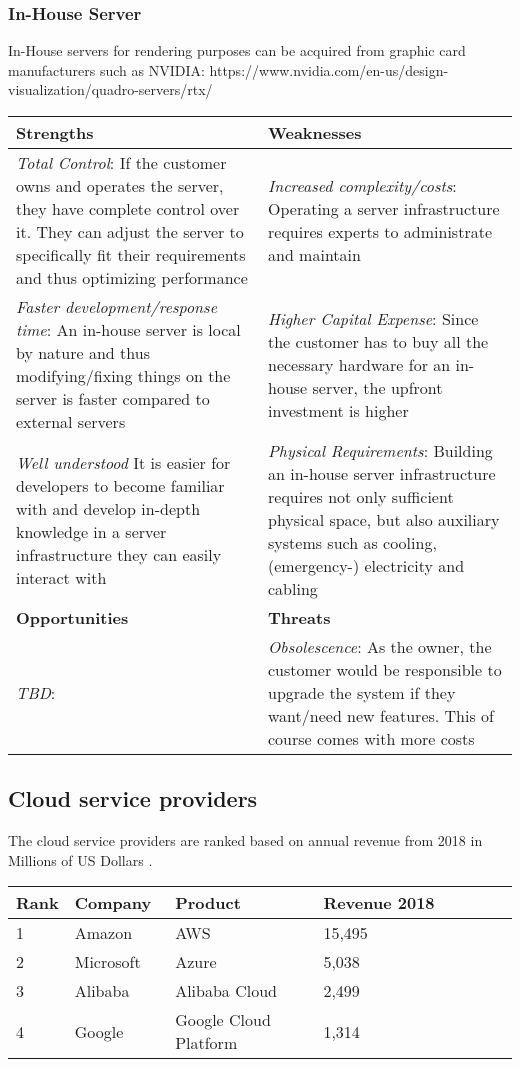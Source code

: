 \subsubsection{In-House Server}
In-House servers for rendering purposes can be acquired from graphic card manufacturers such as NVIDIA: https://www.nvidia.com/en-us/design-visualization/quadro-servers/rtx/

\begin{center}
\begin{tabular}{ | p{0.5\linewidth} | p{0.5\linewidth} | } 
 \hline
 \textbf{Strengths} & \textbf{Weaknesses}\\ 
\hline
 \textit{Total Control}: If the customer owns and operates the server, they have complete control over it. They can adjust the server to specifically fit their requirements and thus optimizing performance & \textit{Increased complexity/costs}: Operating a server infrastructure requires experts to administrate and maintain \\ 
\textit{Faster development/response time}: An in-house server is local by nature and thus modifying/fixing things on the server is faster compared to external servers & \textit{Higher Capital Expense}: Since the customer has to buy all the necessary hardware for an in-house server, the upfront investment is higher \\
\textit{Well understood} It is easier for developers to become familiar with and develop in-depth knowledge in a server infrastructure they can easily interact with & \textit{Physical Requirements}: Building an in-house server infrastructure requires not only sufficient physical space, but also auxiliary systems such as cooling, (emergency-) electricity and cabling \\
 \hline
 \textbf{Opportunities} & \textbf{Threats}  \\ 
 \hline
\textit{TBD}: & \textit{Obsolescence}: As the owner, the customer would be responsible to upgrade the system if they want/need new features. This of course comes with more costs \\
\hline 
\end{tabular}
\end{center}

\subsection{Cloud service providers}
The cloud service providers are ranked based on annual revenue from 2018 in Millions of US Dollars \parencite{iaasrevenue}.
\begin{center}
\begin{tabular}{ | p{0.1\linewidth} | p{0.2\linewidth} | p{0.3\linewidth} | p{0.4\linewidth} |} 
\hline
\textbf{Rank} & \textbf{Company} & \textbf{Product} & \textbf{Revenue 2018} \\ 
\hline
1 & Amazon & AWS & 15,495\\
\hline
2 & Microsoft & Azure & 5,038 \\
\hline
3 & Alibaba & Alibaba Cloud & 2,499 \\
\hline
4 & Google & Google Cloud Platform & 1,314\\
\hline
\end{tabular}
\end{center}